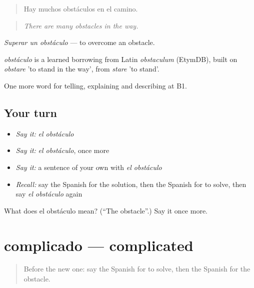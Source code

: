 \begin{quote}
Hay muchos obstáculos en el camino.
\end{quote}

\begin{quote}
\emph{There are many obstacles in the way.}
\end{quote}

\emph{Superar un obstáculo} — to overcome an obstacle.

\begin{cousinweb}
\emph{obstáculo} is a learned borrowing from Latin \emph{obstaculum} (EtymDB), built on \emph{obstare} 'to stand in the way', from \emph{stare} 'to stand'.
\end{cousinweb}

\begin{grammarlens}[title={What you've built}]
One more word for telling, explaining and describing at B1.
\end{grammarlens}

\subsection*{Your turn}
\begin{itemize}
\raggedright
  \item \emph{Say it:} \emph{el obstáculo}
  \item \emph{Say it:} \emph{el obstáculo}, once more
  \item \emph{Say it:} a sentence of your own with \emph{el obstáculo}
  \item \emph{Recall:} say the Spanish for the solution, then the Spanish for to solve, then say \emph{el obstáculo} again
\end{itemize}

\begin{tcolorbox}[breakable,colback=teal!4,colframe=teal!35!black,title={Before you move on}]
What does el obstáculo mean? (\textquotedblleft{}The obstacle\textquotedblright{}.) Say it once more.
\end{tcolorbox}
\section[complicado]{complicado — complicated}

\label{lesson:ES-C620-complicado}



\begin{quote}
Before the new one: say the Spanish for to solve, then the Spanish for the obstacle.
\end{quote}

